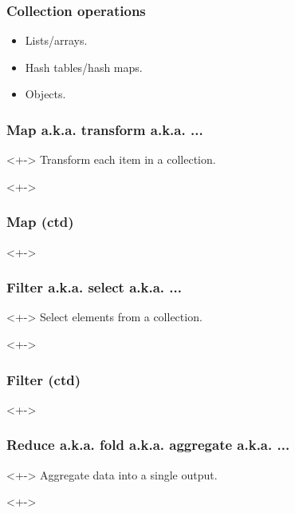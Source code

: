 \begin{frame}
	\frametitle{Collection operations}
	\begin{itemize}[<+-| highlight@+>]
		\item Lists/arrays.
		\item Hash tables/hash maps.
		\item Objects.
	\end{itemize}
\end{frame}


\begin{frame}
	\frametitle{Map a.k.a. transform a.k.a. ...}
	\begin{block}{}<+->
		Transform each item in a collection.
	\end{block}
	\begin{block}{}<+->
		
	\end{block}
\end{frame}


\begin{frame}
	\frametitle{Map (ctd)}
	\begin{block}{}<+->
		
	\end{block}
\end{frame}


\begin{frame}
	\frametitle{Filter a.k.a. select a.k.a. ...}
	\begin{block}{}<+->
		Select elements from a collection.
	\end{block}
	\begin{block}{}<+->
		
	\end{block}
\end{frame}


\begin{frame}
	\frametitle{Filter (ctd)}
	\begin{block}{}<+->
		
	\end{block}
\end{frame}


\begin{frame}
	\frametitle{Reduce a.k.a. fold a.k.a. aggregate a.k.a. ...}
	\begin{block}{}<+->
		Aggregate data into a single output.
	\end{block}
	\begin{block}{}<+->
		
	\end{block}
\end{frame}


